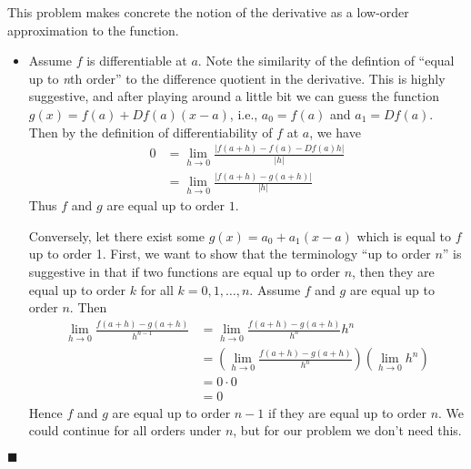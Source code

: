 \documentclass[12pt]{article}
\renewcommand{\qed}{\hfill$\blacksquare$}
\renewenvironment{proof}{\begin{addmargin}[1em]{0em}\begin{newproof}}{\end{newproof}\end{addmargin}\qed}
\begin{document}
\begin{proof}
This problem makes concrete the notion of the derivative as a low-order approximation to the function.
\begin{itemize}
	\item Assume $f$ is differentiable at $a$. Note the similarity of the defintion of ``equal up to \textit{n}th order'' to the difference quotient in the derivative. This is highly suggestive, and after playing around a little bit we can guess the function $g\left(x\right) = f\left(a\right) + Df\left(a\right) \left(x-a\right)$, i.e., $a_0 = f\left(a\right)$ and $a_1 = Df\left(a\right)$. Then by the definition of differentiability of $f$ at $a$, we have
	\begin{equation*}
	\begin{split}	
	0 & = \lim_{h\rightarrow 0} \frac{\left| f\left(a+h\right)-f\left(a\right) - Df\left(a\right) h \right|}{\left|h\right|} \\ 
	& = \lim_{h\rightarrow 0} \frac{\left| f\left(a+h\right) - g\left(a+h\right) \right|}{\left|h\right|}
	\end{split}
	\end{equation*}
Thus $f$ and $g$ are equal up to order $1$.

Conversely, let there exist some $g\left(x\right) = a_0 + a_1 \left(x-a\right)$ which is equal to $f$ up to order 1. First, we want to show that the terminology ``up to order $n$'' is suggestive in that if two functions are equal up to order $n$, then they are equal up to order $k$ for all $k = 0, 1,\ldots, n$. Assume $f$ and $g$ are equal up to order $n$. Then
\begin{equation*}\begin{split} \lim_{h\rightarrow 0} \frac{f\left(a+h\right)-g\left(a+h\right)}{h^{n-1}} & = \lim_{h\rightarrow 0} \frac{f\left(a+h\right)-g\left(a+h\right)}{h^n} h^n \\
& = \left( \lim_{h\rightarrow 0} \frac{f\left(a+h\right) - g\left(a+h\right)}{h^n} \right) \left( \lim_{h\rightarrow 0} h^n \right) \\
& = 0 \cdot 0 \\
& = 0
\end{split}\end{equation*}
Hence $f$ and $g$ are equal up to order $n-1$ if they are equal up to order $n$. We could continue for all orders under $n$, but for our problem we don't need this.


\end{itemize}
\end{proof}
\end{document}

